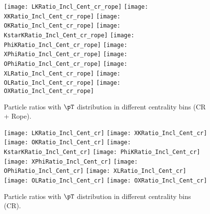 
\begin{figure}[ht]
        \begin{center}
                \texttt{[image: LKRatio\_Incl\_Cent\_cr\_rope]}
                \texttt{[image: XKRatio\_Incl\_Cent\_cr\_rope]}
                \texttt{[image: OKRatio\_Incl\_Cent\_cr\_rope]}
                \texttt{[image: KstarKRatio\_Incl\_Cent\_cr\_rope]}
                \texttt{[image: PhiKRatio\_Incl\_Cent\_cr\_rope]}
                \texttt{[image: XPhiRatio\_Incl\_Cent\_cr\_rope]}
                \texttt{[image: OPhiRatio\_Incl\_Cent\_cr\_rope]}
                \texttt{[image: XLRatio\_Incl\_Cent\_cr\_rope]}
                \texttt{[image: OLRatio\_Incl\_Cent\_cr\_rope]}
                \texttt{[image: OXRatio\_Incl\_Cent\_cr\_rope]}
        \end{center}
	\caption{Particle ratios with $\pT$ distribution in different centrality bins (CR + Rope).}
        \label{fig:InclParRatioCentcrandrope}
\end{figure}
\begin{figure}[ht]
        \begin{center}
                \texttt{[image: LKRatio\_Incl\_Cent\_cr]}
                \texttt{[image: XKRatio\_Incl\_Cent\_cr]}
                \texttt{[image: OKRatio\_Incl\_Cent\_cr]}
                \texttt{[image: KstarKRatio\_Incl\_Cent\_cr]}
                \texttt{[image: PhiKRatio\_Incl\_Cent\_cr]}
                \texttt{[image: XPhiRatio\_Incl\_Cent\_cr]}
                \texttt{[image: OPhiRatio\_Incl\_Cent\_cr]}
                \texttt{[image: XLRatio\_Incl\_Cent\_cr]}
                \texttt{[image: OLRatio\_Incl\_Cent\_cr]}
                \texttt{[image: OXRatio\_Incl\_Cent\_cr]}
        \end{center}
	\caption{Particle ratios with $\pT$ distribution in different centrality bins (CR).}
        \label{fig:InclParRatioCentcr}
\end{figure}
